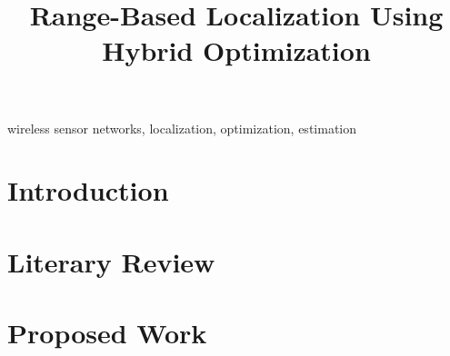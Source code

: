 \documentclass[conference]{IEEEtran}
\begin{document}
\title{Range-Based Localization Using Hybrid Optimization}

\author{
}

\maketitle

\begin{abstract}


\end{abstract}

\begin{IEEEkeywords}
wireless sensor networks, localization, optimization, estimation
\end{IEEEkeywords}

\section{Introduction}
\label{sec:intro}


\section{Literary Review}
\label{sec:lit-rev}


\section{Proposed Work}






\printbibliography
\end{document}
